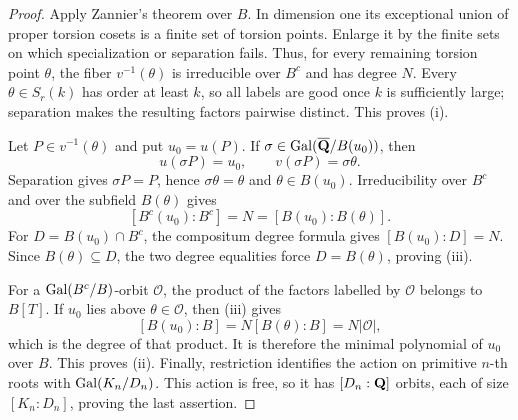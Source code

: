 \begin{proof}
Apply Zannier's theorem \cite[Theorem 2.1]{Zannier2010} over $B$.  In
dimension one its exceptional union of proper torsion cosets is a
finite set of torsion points.  Enlarge it by the finite sets on which
specialization or separation fails.  Thus, for every remaining torsion
point $\theta$, the fiber $v^{-1}(\theta)$ is irreducible over $B^c$
and has degree $N$.  Every $\theta\in S_r(k)$ has order at least $k$,
so all labels are good once $k$ is sufficiently large; separation
makes the resulting factors pairwise distinct.  This proves (i).

Let $P\in v^{-1}(\theta)$ and put $u_0=u(P)$.  If
$\sigma\in\operatorname{Gal}(\overline{\mathbf Q}/B(u_0))$, then
\[
 u(\sigma P)=u_0,\qquad v(\sigma P)=\sigma\theta.
\]
Separation gives $\sigma P=P$, hence $\sigma\theta=\theta$ and
$\theta\in B(u_0)$.  Irreducibility over $B^c$ and over the subfield
$B(\theta)$ gives
\[
 [B^c(u_0):B^c]=N=[B(u_0):B(\theta)].
\]
For $D=B(u_0)\cap B^c$, the compositum degree formula gives
$[B(u_0):D]=N$.  Since $B(\theta)\subseteq D$, the two degree
equalities force $D=B(\theta)$, proving (iii).

For a $\operatorname{Gal}(B^c/B)$-orbit $\mathcal O$, the product of the factors
labelled by $\mathcal O$ belongs to $B[T]$.  If $u_0$ lies above
$\theta\in\mathcal O$, then (iii) gives
\[
 [B(u_0):B]
 =N[B(\theta):B]
 =N|\mathcal O|,
\]
which is the degree of that product.  It is therefore the minimal
polynomial of $u_0$ over $B$.  This proves (ii).  Finally, restriction
identifies the action on primitive $n$-th roots with
$\operatorname{Gal}(K_n/D_n)$.  This action is free, so it has $[D_n:\mathbf Q]$ orbits,
each of size $[K_n:D_n]$, proving the last assertion.
\end{proof}
